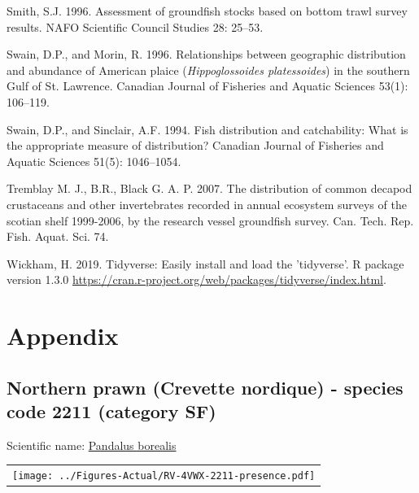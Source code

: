 \documentclass[12pt]{article}\usepackage[]{graphicx}\usepackage[]{color}
\begin{document}
\begin{CSLReferences}{1}{0}
\leavevmode\hypertarget{ref-Smith:1996}{}%
Smith, S.J. 1996. Assessment of groundfish stocks based on bottom trawl survey results. {NAFO} Scientific Council Studies 28: 25--53.

\leavevmode\hypertarget{ref-Swain:Morin:1996:cjfas}{}%
Swain, D.P., and Morin, R. 1996. Relationships between geographic distribution and abundance of {A}merican plaice (\emph{{H}ippoglossoides platessoides}) in the southern {G}ulf of {S}t. {L}awrence. Canadian Journal of Fisheries and Aquatic Sciences 53(1): 106--119.

\leavevmode\hypertarget{ref-Swain:Sinclair:1994:cjfas}{}%
Swain, D.P., and Sinclair, A.F. 1994. Fish distribution and catchability: {W}hat is the appropriate measure of distribution? Canadian Journal of Fisheries and Aquatic Sciences 51(5): 1046--1054.

\leavevmode\hypertarget{ref-Tremblayetal:2007}{}%
Tremblay M. J., B.R., Black G. A. P. 2007. The distribution of common decapod crustaceans and other invertebrates recorded in annual ecosystem surveys of the scotian shelf 1999-2006, by the research vessel groundfish survey. Can. Tech. Rep. Fish. Aquat. Sci. 74.

\leavevmode\hypertarget{ref-R:Tidyverse}{}%
Wickham, H. 2019. Tidyverse: Easily install and load the 'tidyverse'. R package version 1.3.0 \url{https://cran.r-project.org/web/packages/tidyverse/index.html}.

\end{CSLReferences}
\pagebreak

\hypertarget{appendix}{%
\section{Appendix}\label{appendix}}

\pagebreak 

\renewcommand\thefigure{\thesubsection\Alph{figure}}

\setcounter{figure}{0}

\hypertarget{sec:2211}{%
\subsection{Northern prawn (Crevette nordique) - species code 2211 (category SF)}\label{sec:2211}}

  


Scientific name: \href{http://www.marinespecies.org/aphia.php?p=taxdetails\&id=107649}{Pandalus borealis} \newline
\begin{minipage}{1.0\textwidth}
 \begin{tabular}{c}
\texttt{[image: ../Figures-Actual/RV-4VWX-2211-presence.pdf]} \\ 
\end{tabular} 
\end{minipage}
\clearpage
\end{document}
